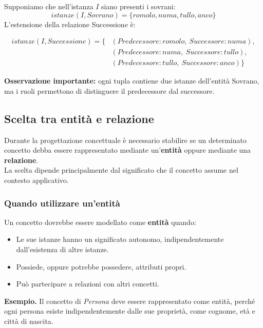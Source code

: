 \noindent
Supponiamo che nell'istanza $I$ siano presenti i sovrani:
\[
istanze(I,Sovrano)=
\{romolo,numa,tullo,anco\}
\]
L'estensione della relazione Successione è:

\[
\begin{aligned}
istanze(I,Successione)=\{&
(Predecessore:romolo,\ Successore:numa),\\
&(Predecessore:numa,\ Successore:tullo),\\
&(Predecessore:tullo,\ Successore:anco)
\}
\end{aligned}
\]

\noindent
\textbf{Osservazione importante:} ogni tupla contiene
due istanze dell'entità Sovrano, ma i ruoli permettono
di distinguere il predecessore dal successore.




\subsection{Scelta tra entità e relazione}

Durante la progettazione concettuale è necessario stabilire
se un determinato concetto debba essere rappresentato
mediante un'\textbf{entità} oppure mediante una
\textbf{relazione}.\\
La scelta dipende principalmente dal significato che
il concetto assume nel contesto applicativo.

\subsubsection*{Quando utilizzare un'entità}

Un concetto dovrebbe essere modellato come
\textbf{entità} quando:

\begin{itemize}
    \item Le sue istanze hanno un significato autonomo,
    indipendentemente dall'esistenza di altre istanze.

    \item Possiede, oppure potrebbe possedere,
    attributi propri.

    \item Può partecipare a relazioni con altri concetti.
\end{itemize}
\noindent
\textcolor{verdeEsempio}{\textbf{Esempio.}}
Il concetto di \textit{Persona} deve essere rappresentato
come entità, perché ogni persona esiste indipendentemente
dalle sue proprietà, come cognome, età e città di nascita.

